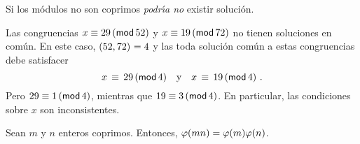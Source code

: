Si los m\'odulos no son coprimos \emph{podr\'{\i}a no} existir soluci\'on.

\begin{ejemChino}\label{ejem:chino:no}
	Las congruencias $x\equiv 29\tmodulo[52]$ y
	$x\equiv 19\tmodulo[72]$ no tienen soluciones en com\'un.
	En este caso, $\mcd{52,72}=4$ y las toda soluci\'on com\'un
	a estas congruencias debe satisfacer
	\begin{displaymath}
		x\,\equiv\,29\tmodulo[4]\dispand
		x\,\equiv\,19\tmodulo[4]
		\dispstop
	\end{displaymath}
	Pero $29\equiv 1\tmodulo[4]$, mientras que $19\equiv 3\tmodulo[4]$.
	En particular, las condiciones sobre $x$ son inconsistentes.
\end{ejemChino}

\begin{coroChino}\label{coro:chino:euler}
	Sean $m$ y $n$ enteros coprimos. Entonces,
	$\eulerphi(mn)=\eulerphi(m)\eulerphi(n)$.
\end{coroChino}

